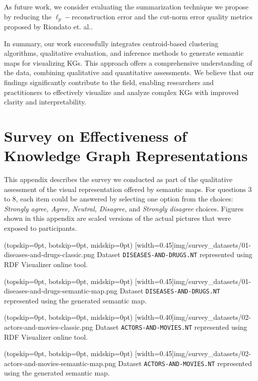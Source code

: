 \documentclass{ieeeaccess}
\begin{document}
As future work, we consider evaluating the
summarization technique we propose by reducing the
$\ell_{p}-$reconstruction error and the cut-norm
error quality metrics proposed by Riondato et. al.\cite{Riondato2014}.

In summary, our work successfully integrates
centroid-based clustering algorithms, qualitative
evaluation, and inference methods to generate semantic
maps for visualizing KGs. This approach
offers a comprehensive understanding of the data, 
combining qualitative and quantitative assessments. We 
believe that our findings significantly contribute to
the field, enabling researchers and practitioners to
effectively visualize and analyze complex KGs with 
improved clarity and interpretability.

\appendices

\section{Survey on Effectiveness of Knowledge Graph Representations}
\label{app:survey}

This appendix describes the survey we conducted as
part of the qualitative assessment of the visual
representation offered by semantic maps. For 
questions 3 to 8, each item could be answered
by selecting one option from the choices: 
\textit{Strongly 
agree, Agree, Neutral, Disagree}, and \textit{Strongly disagree} choices. Figures
shown in this appendix are scaled versions of
the actual pictures that were exposed to participants.

\Figure[h!](topskip=0pt, botskip=0pt, midskip=0pt)
[width=0.45\textwidth]{img/survey_datasets/01-diseases-and-drugs-classic.png}
{Dataset \texttt{DISEASES-AND-DRUGS.NT} represented using RDF Visualizer online tool. \label{Fig:DiseasesDrugsClassical}}

\Figure[h!](topskip=0pt, botskip=0pt, midskip=0pt)
[width=0.45\textwidth]{img/survey_datasets/01-diseases-and-drugs-semantic-map.png}
{Dataset \texttt{DISEASES-AND-DRUGS.NT} represented using the generated semantic map. \label{Fig:DiseasesDrugsSemMap}}

\Figure[h!](topskip=0pt, botskip=0pt, midskip=0pt)
[width=0.40\textwidth]{img/survey_datasets/02-actors-and-movies-classic.png}
{Dataset \texttt{ACTORS-AND-MOVIES.NT} represented using RDF Visualizer online tool. \label{Fig:MoviesActorsClassical}}

\Figure[h!](topskip=0pt, botskip=0pt, midskip=0pt)
[width=0.45\textwidth]{img/survey_datasets/02-actors-and-movies-semantic-map.png}
{Dataset \texttt{ACTORS-AND-MOVIES.NT} represented using the generated semantic map. \label{Fig:MoviesActorsSemMap}}
\end{document}

